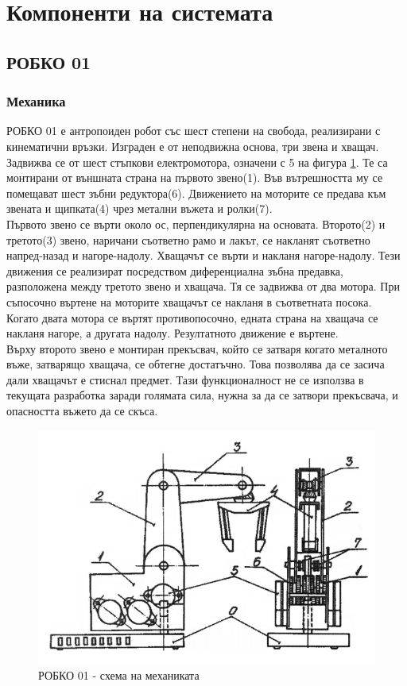 \section{Компоненти на системата}
\subsection{РОБКО 01}
\subsubsection{Механика}
\indent{}
РОБКО 01 е антропоиден робот със шест степени на свобода, реализирани с кинематични връзки.
\cite{robko-man}
Изграден е от неподвижна основа, три звена и хващач. Задвижва се от шест стъпкови електромотора, означени с 5 на фигура \ref{fig:mech}. Те са монтирани от външната страна на първото звено(1). Във вътрешността му се помещават шест зъбни редуктора(6). Движението на моторите се предава към звената и щипката(4) чрез метални въжета и ролки(7).\\
\indent{}
Първото звено се върти около ос, перпендикулярна на основата. Второто(2) и третото(3) звено, наричани съответно рамо и лакът, се накланят съответно напред-назад и нагоре-надолу. Хващачът се върти и накланя нагоре-надолу. Тези движения се реализират посредством диференциална зъбна предавка, разположена между третото звено и хващача. Тя се задвижва от два мотора. При съпосочно въртене на моторите хващачът се накланя в съответната посока. Когато двата мотора се въртят противопосочно, едната страна на хващача се накланя нагоре, а другата надолу. Резултатното движение е въртене.\\
\indent{}
Върху второто звено е монтиран прекъсвач, който се затваря когато металното въже, затварящо хващача, се обтегне достатъчно. Това позволява да се засича дали хващачът е стиснал предмет. Тази функционалност не се използва в текущата разработка заради голямата сила, нужна за да се затвори прекъсвача, и опасността въжето да се скъса.
\FloatBarrier
\begin{figure}[!htb]
    \centering
    \includegraphics[width=\linewidth]{pictures/Robko_axis.PNG}
    \caption{РОБКО 01 - схема на механиката}
    \label{fig:mech}
\end{figure}
